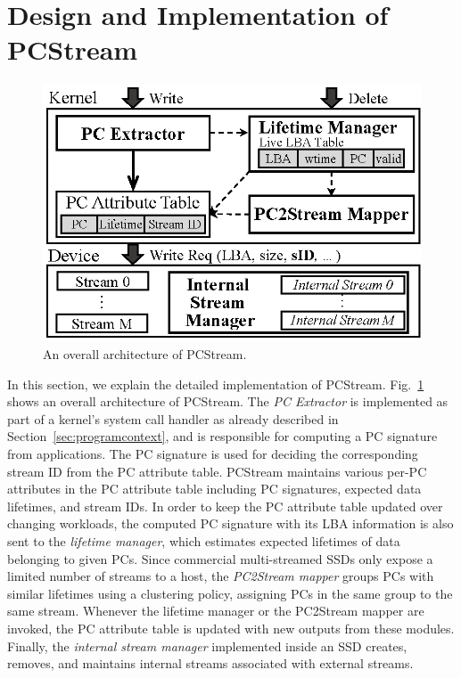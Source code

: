 \vspace{-10pt}
\section{Design and Implementation of \textsf{PCStream}}
\vspace{-5pt}

\begin{figure}[t]
	\centering
	\includegraphics[width=0.8\linewidth]{figure/overview_1}
	\vspace{-9pt}
	\caption{An overall architecture of \textsf{\small PCStream}.}
	\label{fig:architecture}
	\vspace{-10pt}
\end{figure}


In this section, we explain the detailed implementation of \textsf{\small
PCStream}.  Fig.~\ref{fig:architecture} shows an overall architecture of
\textsf{\small PCStream}. The \textit{PC Extractor} is implemented as part of a
kernel's system call handler as already described in
Section~\ref{sec:programcontext}, and is responsible for computing a PC
signature from applications.  The PC signature is used for deciding the
corresponding stream ID from
the PC attribute table.  \textsf{\small PCStream} maintains various per-PC
attributes in the PC attribute table including PC signatures, expected data
lifetimes, and stream IDs.  In order to keep the PC attribute table updated
over changing workloads, the computed PC signature with its LBA information is
also sent to the {\it lifetime manager}, which estimates expected lifetimes of
data belonging to given PCs.  Since commercial multi-streamed SSDs only expose
a limited number of streams to a host, the \textit{PC2Stream mapper} groups PCs
with similar lifetimes using a clustering policy, assigning PCs in the same
group to the same stream.  Whenever the lifetime manager or the PC2Stream
mapper are invoked, the PC attribute table is updated with new outputs from
these modules.  Finally, the \textit{internal stream manager} implemented
inside an SSD creates, removes, and maintains internal streams associated with
external streams.

